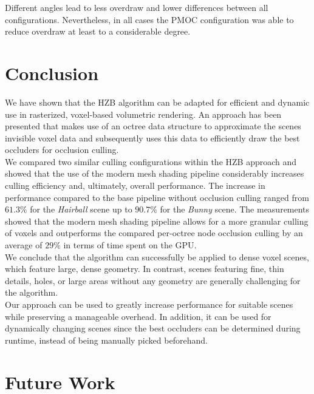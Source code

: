 \documentclass[conference]{IEEEtran}
\begin{document}
\noindent
Different angles lead to less overdraw and lower differences between all configurations. Nevertheless, 
in all cases the \ac{PMOC} configuration was able to reduce overdraw at least to a 
considerable degree.

\section{Conclusion} \label{sec-conclusion}

\noindent
We have shown that the \ac{HZB} algorithm can be adapted for efficient and dynamic use in rasterized, voxel-based 
volumetric rendering. An approach has been presented that makes use of an octree data structure to approximate 
the scenes invisible voxel data and subsequently uses this data to efficiently draw the best occluders for occlusion 
culling. \\

\noindent
We compared two similar culling configurations within the \ac{HZB} approach and showed that the use of the 
modern mesh shading pipeline considerably increases culling efficiency and, ultimately, overall performance.
The increase in performance compared to the base pipeline without occlusion culling ranged from $61.3 \%$ for 
the \emph{Hairball} scene up to $90.7 \%$ for the \emph{Bunny} scene. The measurements showed that the modern 
mesh shading pipeline allows for a more granular culling of voxels and outperforms the compared per-octree 
node occlusion culling by an average of $29 \%$ in terms of time spent on the \ac{GPU}. \\

\noindent
We conclude that the algorithm can successfully be applied to dense voxel scenes, which feature large, dense 
geometry. In contrast, scenes featuring fine, thin details, holes, or large areas without any geometry are 
generally challenging for the algorithm. \\

\noindent
Our approach can be used to greatly increase performance for suitable scenes while preserving a manageable 
overhead. In addition, it can be used for dynamically changing scenes since the best occluders can be 
determined during runtime, instead of being manually picked beforehand.

\section{Future Work} \label{sec-future-work}
\end{document}

